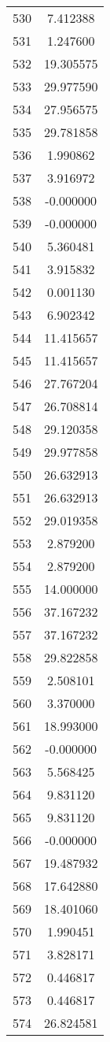\documentclass[12pt]{article}
\begin{document}
\begin{longtable}{@{}cc@{}}
530 & 7.412388 \\
531 & 1.247600 \\
532 & 19.305575 \\
533 & 29.977590 \\
534 & 27.956575 \\
535 & 29.781858 \\
536 & 1.990862 \\
537 & 3.916972 \\
538 & -0.000000 \\
539 & -0.000000 \\
540 & 5.360481 \\
541 & 3.915832 \\
542 & 0.001130 \\
543 & 6.902342 \\
544 & 11.415657 \\
545 & 11.415657 \\
546 & 27.767204 \\
547 & 26.708814 \\
548 & 29.120358 \\
549 & 29.977858 \\
550 & 26.632913 \\
551 & 26.632913 \\
552 & 29.019358 \\
553 & 2.879200 \\
554 & 2.879200 \\
555 & 14.000000 \\
556 & 37.167232 \\
557 & 37.167232 \\
558 & 29.822858 \\
559 & 2.508101 \\
560 & 3.370000 \\
561 & 18.993000 \\
562 & -0.000000 \\
563 & 5.568425 \\
564 & 9.831120 \\
565 & 9.831120 \\
566 & -0.000000 \\
567 & 19.487932 \\
568 & 17.642880 \\
569 & 18.401060 \\
570 & 1.990451 \\
571 & 3.828171 \\
572 & 0.446817 \\
573 & 0.446817 \\
574 & 26.824581 \\

\end{longtable}
\end{document}
